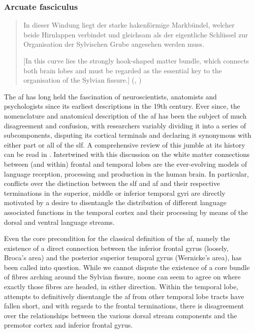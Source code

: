 \subsubsection*{Arcuate fasciculus}

\begin{quote}
  In dieser Windung liegt der starke hakenförmige Markbündel, welcher beide Hirnlappen verbindet und gleichsam als der eigentliche Schlüssel zur Organisation der Sylvischen Grube angesehen werden muss.

  [In this curve lies the strongly hook-shaped matter bundle, which connects both brain lobes and must be regarded as the essential key to the organisation of the Sylvian fissure.] (\citeauthor{Reil1809}, \citeyear{Reil1809}\autocite{Reil1809})
\end{quote}

The \gls{af} has long held the fascination of neuroscientists, anatomists and psychologists since its earliest descriptions in the 19th century.
Ever since, the nomenclature and anatomical description of the \gls{af} has been the subject of much disagreement and confusion, with researchers variably dividing it into a series of subcomponents, disputing its cortical terminals and declaring it synonymous with either part or all of the \gls{slf}.
A comprehensive review of this jumble at its history can be read in \textcite{PortodeOliveira2021}.
Intertwined with this discussion on the white matter connections between (and within) frontal and temporal lobes are the ever-evolving models of language reception, processing and production in the human brain.\autocite{Becker2022a}
In particular, conflicts over the distinction between the \gls{slf} and \gls{af} and their respective terminations in the superior, middle or inferior temporal gyri are directly motivated by a desire to disentangle the distribution of different language associated functions in the temporal cortex and their processing by means of the dorsal and ventral language streams.\autocite{Hickok2004,Friederici2013a,Kljajevic2014a,Giampiccolo2022a,Becker2022a}

Even the core precondition for the classical definition of the \gls{af}, namely the existence of a direct connection between the inferior frontal gyrus (loosely, Broca's area) and the posterior superior temporal gyrus (Wernicke's area), has been called into question.\autocite{Dick2012,Giampiccolo2022a}
While we cannot dispute the existence of a core bundle of fibres arching around the Sylvian fissure, noone can seem to agree on where exactly those fibres are headed, in either direction.
Within the temporal lobe, attempts to definitively disentangle the \gls{af} from other temporal lobe tracts have fallen short,\autocite{Becker2022} and with regards to the frontal terminations, there is disagreement over the relationships between the various dorsal stream components and the premotor cortex and inferior frontal gyrus.\autocite{Kljajevic2014a,Giampiccolo2022a}

